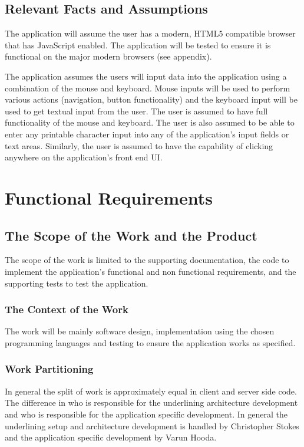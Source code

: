 \documentclass[12pt, titlepage]{article}
\begin{document}
  \subsection{Relevant Facts and Assumptions}
  The application will assume the user has a modern, HTML5 compatible browser
  that has JavaScript enabled. The application will be tested to ensure it is
	functional on the major modern browsers (see appendix).

  The application assumes the users will input data into the application using
  a combination of the mouse and keyboard. Mouse inputs will be used to perform
  various actions (navigation, button functionality) and the keyboard input
  will be used to get textual input from the user. The user is assumed to have
  full functionality of the mouse and keyboard. The user is also assumed to be
  able to enter any printable character input into any of the application's
  input fields or text areas. Similarly, the user is assumed to have the
  capability of clicking anywhere on the application's front end UI.

\section{Functional Requirements}

  \subsection{The Scope of the Work and the Product}
  The scope of the work is limited to the supporting documentation, the code to
  implement the application's functional and non functional requirements, and
  the supporting tests to test the application.

    \subsubsection{The Context of the Work}
		The work will be mainly software design, implementation using the chosen
		programming languages and testing to ensure the application works as
		specified.

    \subsubsection{Work Partitioning}
		In general the split of work is approximately equal in client and server
		side code. The difference in who is responsible for the underlining
		architecture development and who is responsible for the application
		specific development. In general the underlining setup and architecture
		development is handled by Christopher Stokes and the application specific
		development by Varun Hooda.
\end{document}
